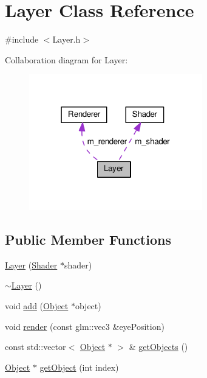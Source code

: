 \hypertarget{class_layer}{}\section{Layer Class Reference}
\label{class_layer}


{\ttfamily \#include $<$Layer.\+h$>$}



Collaboration diagram for Layer\+:
\nopagebreak
\begin{figure}[H]
\begin{center}
\leavevmode
\includegraphics[width=214pt]{class_layer__coll__graph}
\end{center}
\end{figure}
\subsection*{Public Member Functions}
\begin{DoxyCompactItemize}
\item 
\hyperlink{class_layer_ad5cb744328eb91a6c0670efe57a9afbd}{Layer} (\hyperlink{class_shader}{Shader} $\ast$shader)
\item 
\hyperlink{class_layer_a1b1ba4804451dfe6cc357194e42762ae}{$\sim$\+Layer} ()
\item 
void \hyperlink{class_layer_aa1e828db7d673a1083aa2eb211663628}{add} (\hyperlink{class_object}{Object} $\ast$object)
\item 
void \hyperlink{class_layer_ad8f9382947a2b1093bf1c8846751bfa2}{render} (const glm\+::vec3 \&eye\+Position)
\item 
const std\+::vector$<$ \hyperlink{class_object}{Object} $\ast$ $>$ \& \hyperlink{class_layer_ac22c1bfa8ac715224adcf27409019e9f}{get\+Objects} ()
\item 
\hyperlink{class_object}{Object} $\ast$ \hyperlink{class_layer_ae51468bd68ee2ba01571efc430ac666f}{get\+Object} (int index)
\end{DoxyCompactItemize}
